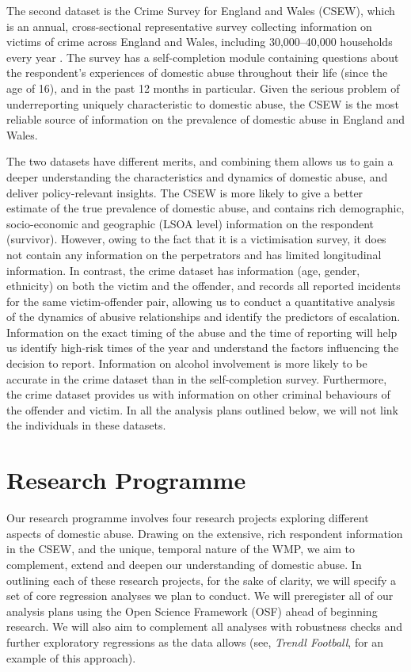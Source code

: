 \documentclass[11pt, a4paper]{article}
\begin{document}
The second dataset is the Crime Survey for England and Wales (CSEW), which is an annual, cross-sectional representative survey collecting information on victims of crime across England and Wales, including 30,000--40,000 households every year \cite{OfficeforNationalStatistics2019}. The survey has a self-completion module containing questions about the respondent's experiences of domestic abuse throughout their life (since the age of 16), and in the past 12 months in particular. Given the serious problem of underreporting uniquely characteristic to domestic abuse, the CSEW is the most reliable source of information on the prevalence of domestic abuse in England and Wales. 

The two datasets have different merits, and combining them allows us to gain a deeper understanding the characteristics and dynamics of domestic abuse, and deliver policy-relevant insights. The CSEW is more likely to give a better estimate of the true prevalence of domestic abuse, and contains rich demographic, socio-economic and geographic (LSOA level) information on the respondent (survivor). However, owing to the fact that it is a victimisation survey, it does not contain any information on the perpetrators and has limited longitudinal information. In contrast, the crime dataset has information (age, gender, ethnicity) on both the victim and the offender, and records all reported incidents for the same victim-offender pair, allowing us to conduct a quantitative analysis of the dynamics of abusive relationships and identify the predictors of escalation. Information on the exact timing of the abuse and the time of reporting will help us identify high-risk times of the year and understand the factors influencing the decision to report. Information on alcohol involvement is more likely to be accurate in the crime dataset than in the self-completion survey. Furthermore, the crime dataset provides us with information on other criminal behaviours of the offender and victim. In all the analysis plans outlined below, we will not link the individuals in these datasets.


\newpage

\section*{Research Programme}

Our research programme involves four research projects exploring different aspects of domestic abuse. Drawing on the extensive, rich respondent information in the CSEW, and the unique, temporal nature of the WMP, we aim to complement, extend and deepen our understanding of domestic abuse. In outlining each of these research projects, for the sake of clarity, we will specify a set of core regression analyses we plan to conduct. We will preregister all of our analysis plans using the Open Science Framework (OSF) ahead of beginning research. We will also aim to complement all analyses with robustness checks and further exploratory regressions as the data allows (see, \textit{Trendl Football}, for an example of this approach).
\end{document}
